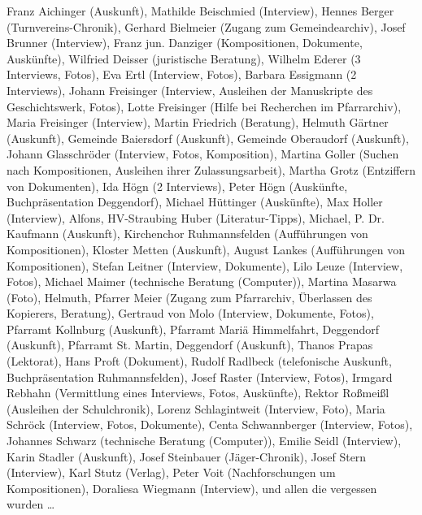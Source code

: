 \documentclass{book}
\begin{document}
Franz Aichinger (Auskunft), Mathilde Beischmied (Interview), Hennes
Berger (Turnvereins-Chronik), Gerhard Bielmeier (Zugang zum
Gemeindearchiv), Josef Brunner (Interview), Franz jun. Danziger
(Kompositionen, Dokumente, Auskünfte), Wilfried Deisser (juristische
Beratung), Wilhelm Ederer (3 Interviews, Fotos), Eva Ertl (Interview,
Fotos), Barbara Essigmann (2 Interviews), Johann Freisinger (Interview,
Ausleihen der Manuskripte des Geschichtswerk, Fotos), Lotte Freisinger
(Hilfe bei Recherchen im Pfarrarchiv), Maria Freisinger (Interview),
Martin Friedrich (Beratung), Helmuth Gärtner (Auskunft), Gemeinde
Baiersdorf (Auskunft), Gemeinde Oberaudorf (Auskunft), Johann
Glasschröder (Interview, Fotos, Komposition), Martina Goller (Suchen
nach Kompositionen, Ausleihen ihrer Zulassungsarbeit), Martha Grotz
(Entziffern von Dokumenten), Ida Högn (2 Interviews), Peter Högn
(Auskünfte, Buchpräsentation Deggendorf), Michael Hüttinger
(Auskünfte), Max Holler (Interview), Alfons, HV-Straubing Huber
(Literatur-Tipps), Michael, P. Dr. Kaufmann (Auskunft), Kirchenchor
Ruhmannsfelden (Aufführungen von Kompositionen), Kloster Metten
(Auskunft), August Lankes (Aufführungen von Kompositionen), Stefan
Leitner (Interview, Dokumente), Lilo Leuze (Interview, Fotos), Michael
Maimer (technische Beratung (Computer)), Martina Masarwa (Foto),
Helmuth, Pfarrer Meier (Zugang zum Pfarrarchiv, Überlassen des
Kopierers, Beratung), Gertraud von Molo (Interview, Dokumente, Fotos),
Pfarramt Kollnburg (Auskunft), Pfarramt Mariä Himmelfahrt, Deggendorf
(Auskunft), Pfarramt St. Martin, Deggendorf (Auskunft), Thanos Prapas
(Lektorat), Hans Proft (Dokument), Rudolf Radlbeck (telefonische
Auskunft, Buchpräsentation Ruhmannsfelden), Josef Raster (Interview,
Fotos), Irmgard Rebhahn (Vermittlung eines Interviews, Fotos,
Auskünfte), Rektor Roßmeißl (Ausleihen der Schulchronik), Lorenz
Schlagintweit (Interview, Foto), Maria Schröck (Interview, Fotos,
Dokumente), Centa Schwannberger (Interview, Fotos), Johannes Schwarz
(technische Beratung (Computer)), Emilie Seidl (Interview), Karin
Stadler (Auskunft), Josef Steinbauer (Jäger-Chronik), Josef Stern
(Interview), Karl Stutz (Verlag), Peter Voit (Nachforschungen um
Kompositionen), Doraliesa Wiegmann (Interview), und allen die vergessen
wurden …
\end{document}

